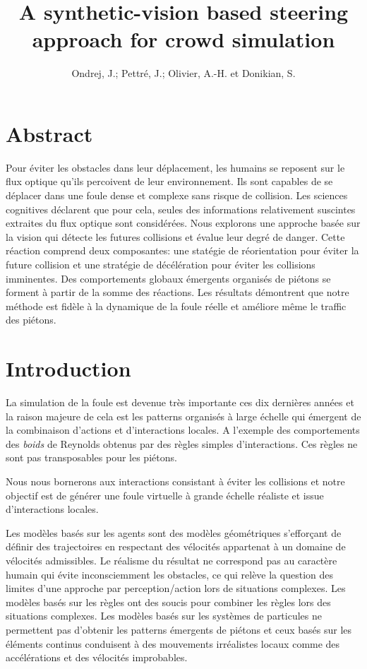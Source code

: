 \documentclass[11pt]{article}
\title{A synthetic-vision based steering approach for crowd simulation}
\author{Ondrej, J.; Pettré, J.; Olivier, A.-H. et Donikian, S.}
\date{
	\begin{center}
		INRIA\\
		INRIA-Goalem\\
		ACM Transactions on Graphics (TOG), ACM, 2010, 29, 123
	\end{center}
}
\begin{document}
\maketitle

\section*{Abstract}

Pour éviter les obstacles dans leur déplacement, les humains se reposent sur le flux optique qu'ils percoivent de leur environnement. Ils sont capables de se déplacer dans une foule dense et complexe sans risque de collision. Les sciences cognitives déclarent que pour cela, seules des informations relativement suscintes extraites du flux optique sont considérées. Nous explorons une approche basée sur la vision qui détecte les futures collisions et évalue leur degré de danger. Cette réaction comprend deux composantes: une statégie de réorientation pour éviter la future collision et une stratégie de décélération pour éviter les collisions imminentes. Des comportements globaux émergents organisés de piétons se forment à partir de la somme des réactions. Les résultats démontrent que notre méthode est fidèle à la dynamique de la foule réelle et améliore même le traffic des piétons.

\section{Introduction}

La simulation de la foule est devenue très importante ces dix dernières années et la raison majeure de cela est les patterns organisés à large échelle qui émergent de la combinaison d'actions et d'interactions locales. A l'exemple des comportements des \textit{boids} de Reynolds  obtenus par des règles simples d'interactions. Ces règles ne sont pas transposables pour les piétons.

Nous nous bornerons aux interactions consistant à éviter les collisions et notre objectif est de générer une foule virtuelle à grande échelle réaliste et issue d'interactions locales.

Les modèles basés sur les agents sont des modèles géométriques s'efforçant de définir des trajectoires en respectant des vélocités appartenat à un domaine de vélocités admissibles. Le réalisme du résultat ne correspond pas au caractère humain qui évite inconsciemment les obstacles, ce qui relève la question des limites d'une approche par perception/action lors de situations complexes.
Les modèles basés sur les règles ont des soucis pour combiner les règles lors des situations complexes.
Les modèles basés sur les systèmes de particules ne permettent pas d'obtenir les patterns émergents de piétons et ceux basés sur les éléments continus conduisent à des mouvements irréalistes locaux comme des accélérations et des vélocités improbables.
\end{document}
